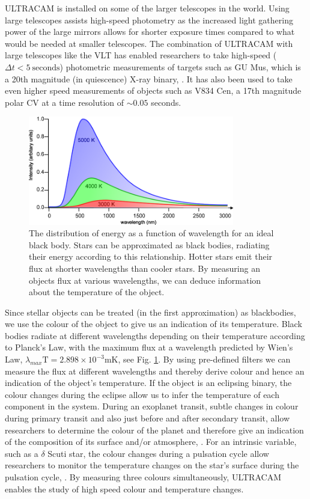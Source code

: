 ULTRACAM is installed on some of the larger telescopes in the world. Using large telescopes assists high-speed photometry as the increased light gathering power of the large mirrors allows for shorter exposure times compared to what would be needed at smaller telescopes. The combination of ULTRACAM with large telescopes like the VLT has enabled researchers to take high-speed ($\Delta t<5~\mbox{seconds}$) photometric measurements of targets such as GU Mus, which is a 20th magnitude (in quiescence) X-ray binary, \citep{tariq2010}. It has also been used to take even higher speed measurements of objects such as V834 Cen, a 17th magnitude polar CV at a time resolution of $\sim 0.05$ seconds.

\begin{figure}
\centering
\includegraphics[width=90mm]{images/wienslaw.png}
\caption[Caption for LOF]{The distribution of energy as a function of wavelength for an ideal black body\protect\footnotemark. Stars can be approximated as black bodies, radiating their energy according to this relationship. Hotter stars emit their flux at shorter wavelengths than cooler stars. By measuring an objects flux at various wavelengths, we can deduce information about the temperature of the object.}
\label{fig:wienslaw}
\end{figure}
Since stellar objects can be treated (in the first approximation) as blackbodies, we use the colour of the object to give us an indication of its temperature. Black bodies radiate at different wavelengths depending on their temperature according to Planck's Law, with the maximum flux at a wavelength predicted by Wien's Law, $\lambda_{max}\mbox{T} = 2.898\times10^{-3}\mbox{mK}$, see Fig. \ref{fig:wienslaw}. By using pre-defined filters we can measure the flux at different wavelengths and thereby derive colour and hence an indication of the object's temperature. If the object is an eclipsing binary, the colour changes during the eclipse allow us to infer the temperature of each component in the system. During an exoplanet transit, subtle changes in colour during primary transit and also just before and after secondary transit, allow researchers to determine the colour of the planet and therefore give an indication of the composition of its surface and/or atmosphere, \citep{2012ApJS..201...36B}. For an intrinsic variable, such as a $\delta$ Scuti star, the colour changes during a pulsation cycle allow researchers to monitor the temperature changes on the star's surface during the pulsation cycle, \citep{KurtzBook}. By measuring three colours simultaneously, ULTRACAM enables the study of high speed colour and temperature changes. 

